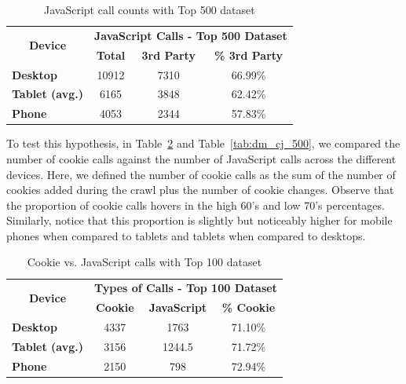 \documentclass{acm_proc_article-sp}
\begin{document}
\begin{table}[h]
  \centering
  \caption{JavaScript call counts with Top 500 dataset}
    \begin{tabular}{|c|c|c|c|}
    \hline
    \multicolumn{1}{|c|}{\multirow{2}[4]{*}{\textbf{Device}}} & \multicolumn{3}{|c|}{\textbf{JavaScript Calls - Top 500 Dataset}} \\ \cline{2-4}
    \multicolumn{1}{|c|}{} & \multicolumn{1}{|c|}{\textbf{Total}} & \multicolumn{1}{|c|}{\textbf{3rd Party}} & \multicolumn{1}{|c|}{\textbf{\% 3rd Party}} \\ \hline
    \multicolumn{1}{|l|}{\textbf{Desktop}} & 10912   & 7310  & 66.99\% \\
    \multicolumn{1}{|l|}{\textbf{Tablet (avg.)}} & 6165   & 3848  & 62.42\% \\
    \multicolumn{1}{|l|}{\textbf{Phone}} & 4053  & 2344 & 57.83\%\\ \hline
    \end{tabular}%
  \label{tab:dm_javascript_500}%
\end{table}%

To test this hypothesis, in Table~\ref{tab:dm_cj_100} and Table~\ref{tab:dm_cj_500}, we compared the number of cookie calls against the number of JavaScript calls across the different devices. Here, we defined the number of cookie calls as the sum of the number of cookies added during the crawl plus the number of cookie changes. Observe that the proportion of cookie calls hovers in the high 60's and low 70's percentages. Similarly, notice that this proportion is slightly but noticeably higher for mobile phones when compared to tablets and tablets when compared to desktops.


\begin{table}[h]
  \centering
  \caption{Cookie vs. JavaScript calls with Top 100 dataset}
    \begin{tabular}{|c|c|c|c|}
    \hline
    \multicolumn{1}{|c|}{\multirow{2}[4]{*}{\textbf{Device}}} & \multicolumn{3}{|c|}{\textbf{Types of Calls - Top 100 Dataset}} \\ \cline{2-4}
    \multicolumn{1}{|c|}{} & \multicolumn{1}{|c|}{\textbf{Cookie}} & \multicolumn{1}{|c|}{\textbf{JavaScript}} & \multicolumn{1}{|c|}{\textbf{\% Cookie}}  \\ \hline
    \multicolumn{1}{|l|}{\textbf{Desktop}} & 4337  & 1763  & 71.10\% \\
    \multicolumn{1}{|l|}{\textbf{Tablet (avg.)}} & 3156   & 1244.5 & 71.72\%  \\
    \multicolumn{1}{|l|}{\textbf{Phone}} & 2150  & 798  & 72.94\% \\ \hline
    \end{tabular}%
  \label{tab:dm_cj_100}%
\end{table}%
\end{document}
